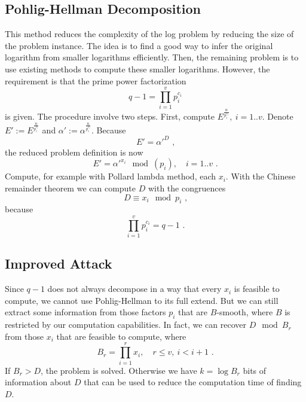 \documentclass[paper=a4, fontsize=11pt]{scrartcl} %
\numberwithin{equation}{section} %
\numberwithin{figure}{section} %
\numberwithin{table}{section} %
\begin{document}
\subsection{Pohlig-Hellman Decomposition} This method reduces the complexity of the log problem by reducing the size of the problem instance. The idea is to find a good way to infer the original logarithm from smaller logarithms efficiently. Then, the remaining problem is to use existing methods to compute these smaller logarithms. However, the requirement is that the prime power factorization
\begin{equation}
q-1 = \prod_{i=1}^v p_i^{c_i}
\end{equation}
is given. The procedure involve two steps. First, compute $E^{\frac{n}{p_i^{c_i}}},\ i=1..v$. Denote $E':= E^{\frac{n}{p_i^{c_i}}}$ and $\alpha' := \alpha^{\frac{n}{p_i^{c_i}}}$. Because
\begin{equation}
E' = \alpha'^D
\text{ ,}
\end{equation}
the reduced problem definition is now
\begin{equation}
E' = \alpha'^{x_i} \mod (p_i),\quad i=1..v
\text{ .}
\end{equation}
Compute, for example with Pollard lambda method, each $x_i$. With the Chinese remainder theorem we can compute $D$ with the congruences
\begin{equation}
D \equiv x_i \mod p_i
\text{ ,}
\end{equation}
because
\begin{equation}
\prod_{i=1}^v p_i^{c_i} = q-1
\text{ .}
\end{equation}

\subsection{Improved Attack}
Since $q-1$ does not always decompose in a way that every $x_i$ is feasible to compute, we cannot use Pohlig-Hellman to its full extend. But we can still extract some information from those factors $p_i$ that are $B$-smooth, where $B$ is restricted by our computation capabilities. In fact, we can recover $D\mod B_r$ from those $x_i$ that are feasible to compute, where
\begin{equation}
B_r = \prod_{i=1}^r x_i,\quad r\leq v,\ i < i+1
\text{ .}
\end{equation}
If $B_r > D$, the problem is solved. Otherwise we have $k = \log B_r$ bits of information about $D$ that can be used to reduce the computation time of finding $D$.
\end{document}
